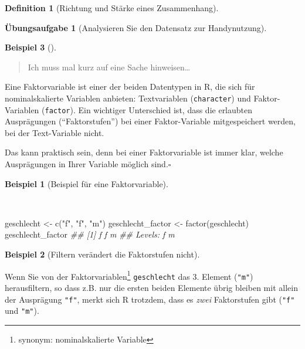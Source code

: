\documentclass[
  a4paper,
  DIV=11]{scrreprt}
\newenvironment{Shaded}{\begin{snugshade}}{\end{snugshade}}
\newcommand{\DocumentationTok}[1]{\textcolor[rgb]{0.37,0.37,0.37}{\textit{#1}}}
\newcommand{\FunctionTok}[1]{\textcolor[rgb]{0.28,0.35,0.67}{#1}}
\newcommand{\NormalTok}[1]{\textcolor[rgb]{0.00,0.23,0.31}{#1}}
\newcommand{\OtherTok}[1]{\textcolor[rgb]{0.00,0.23,0.31}{#1}}
\newcommand{\StringTok}[1]{\textcolor[rgb]{0.13,0.47,0.30}{#1}}
\theoremstyle{definition}
\newtheorem{exercise}{Übungsaufgabe}[chapter]
\theoremstyle{definition}
\newtheorem{example}{Beispiel}[chapter]
\theoremstyle{definition}
\newtheorem{definition}{Definition}[chapter]
\theoremstyle{remark}
\begin{document}
\begin{definition}[Richtung und Stärke eines
Zusammenhang]
\begin{exercise}[Analysieren Sie den Datensatz zur
Handynutzung]
\begin{example}[]
\begin{quote}
{} Ich muss mal kurz auf eine Sache hinweisen\ldots{}
\end{quote}

\begin{tcolorbox}[enhanced jigsaw, leftrule=.75mm, opacitybacktitle=0.6, colback=white, colframe=quarto-callout-note-color-frame, coltitle=black, colbacktitle=quarto-callout-note-color!10!white, opacityback=0, left=2mm, breakable, titlerule=0mm, toptitle=1mm, bottomtitle=1mm, rightrule=.15mm, title=\textcolor{quarto-callout-note-color}{\faInfo}\hspace{0.5em}{Faktorvariable}, arc=.35mm, bottomrule=.15mm, toprule=.15mm]

Eine Faktorvariable ist einer der beiden Datentypen in R, die sich für
nominalskalierte Variablen anbieten: Textvariablen (\texttt{character})
und Faktor-Variablen (\texttt{factor}). Ein wichtiger Unterschied ist,
dass die erlaubten Ausprägungen (``Faktorstufen'') bei einer
Faktor-Variable mitgespeichert werden, bei der Text-Variable nicht.

Das kann praktisch sein, denn bei einer Faktorvariable ist immer klar,
welche Ausprägungen in Ihrer Variable möglich sind.\(\square\)

\end{tcolorbox}

\begin{example}[Beispiel für eine
Faktorvariable]\protect\hypertarget{exm-factor1}{}\label{exm-factor1}

~

\begin{Shaded}
\begin{Highlighting}[]
\NormalTok{geschlecht }\OtherTok{\textless{}{-}} \FunctionTok{c}\NormalTok{(}\StringTok{"f"}\NormalTok{, }\StringTok{"f"}\NormalTok{, }\StringTok{"m"}\NormalTok{)}
\NormalTok{geschlecht\_factor }\OtherTok{\textless{}{-}} \FunctionTok{factor}\NormalTok{(geschlecht)}
\NormalTok{geschlecht\_factor}
\DocumentationTok{\#\# [1] f f m}
\DocumentationTok{\#\# Levels: f m}
\end{Highlighting}
\end{Shaded}

\end{example}

\begin{example}[Filtern verändert die Faktorstufen
nicht]\protect\hypertarget{exm-factor2}{}\label{exm-factor2}

Wenn Sie von der Faktorvariablen\footnote{synonym: nominalskalierte
  Variable} \texttt{geschlecht} das 3. Element (\texttt{"m"})
herausfiltern, so dass z.B. nur die ersten beiden Elemente übrig bleiben
mit allein der Ausprägung \texttt{"f"}, merkt sich R trotzdem, dass es
\emph{zwei} Faktorstufen gibt (\texttt{"f"} und \texttt{"m"}).


\end{example}
\end{example}
\end{exercise}
\end{definition}
\end{document}
